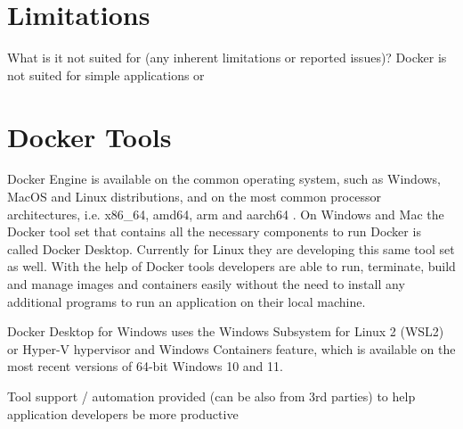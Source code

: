 \documentclass[fleqn,12pt]{olplainarticle}
\begin{document}
\section{Limitations}

What is it not suited for (any inherent limitations or reported issues)?
Docker is not suited for simple applications or  

\section{Docker Tools}

Docker Engine is available on the common operating system, such as Windows, MacOS and Linux distributions, and on the most common processor architectures, i.e. x86\_64, amd64, arm and aarch64 \cite{docker:install}.  On Windows and Mac the Docker tool set that contains all the necessary components to run Docker is called Docker Desktop. Currently for Linux they are developing this same tool set as well. With the help of Docker tools developers are able to run, terminate, build and manage images and containers easily without the need to install any additional programs to run an application on their local machine.

Docker Desktop for Windows uses the Windows Subsystem for Linux 2 (WSL2) or Hyper-V hypervisor and Windows Containers feature, which is available on the most recent versions of 64-bit Windows 10 and 11\cite{docker:windows}.

Tool support / automation provided (can be also from 3rd parties) to help application developers be more productive


\end{document}
